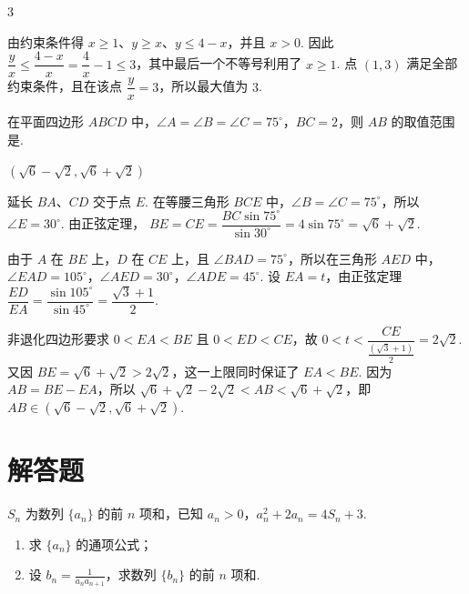\begin{answer}
3
\end{answer}

\begin{solution}
由约束条件得 \(x\geqslant1\)、\(y\geqslant x\)、\(y\leqslant4-x\)，并且 \(x>0\). 因此
\(\dfrac yx\leqslant\dfrac{4-x}{x}=\dfrac4x-1\leqslant3\)，其中最后一个不等号利用了 \(x\geqslant1\). 点 \((1,3)\) 满足全部约束条件，且在该点 \(\dfrac yx=3\)，所以最大值为 \(3\).
\end{solution}

\begin{problem}
在平面四边形 \(ABCD\) 中，\(\angle A = \angle B = \angle C = 75^{\circ}\)，\(BC = 2\)，则 \(AB\) 的取值范围是\fillinblank{}.
\end{problem}

\begin{answer}
\(\left(\sqrt{6}-\sqrt{2},\sqrt{6}+\sqrt{2}\right)\)
\end{answer}

\begin{solution}
延长 \(BA\)、\(CD\) 交于点 \(E\). 在等腰三角形 \(BCE\) 中，\(\angle B=\angle C=75^{\circ}\)，所以 \(\angle E=30^{\circ}\). 由正弦定理，
\(BE=CE=\dfrac{BC\sin75^{\circ}}{\sin30^{\circ}}=4\sin75^{\circ}=\sqrt6+\sqrt2\).

由于 \(A\) 在 \(BE\) 上，\(D\) 在 \(CE\) 上，且 \(\angle BAD=75^{\circ}\)，所以在三角形 \(AED\) 中，\(\angle EAD=105^{\circ}\)，\(\angle AED=30^{\circ}\)，\(\angle ADE=45^{\circ}\). 设 \(EA=t\)，由正弦定理
\(\dfrac{ED}{EA}=\dfrac{\sin105^{\circ}}{\sin45^{\circ}}=\dfrac{\sqrt3+1}{2}\).

非退化四边形要求 \(0<EA<BE\) 且 \(0<ED<CE\)，故
\(0<t<\dfrac{CE}{\frac{(\sqrt3+1)}{2}}=2\sqrt2\). 又因 \(BE=\sqrt6+\sqrt2>2\sqrt2\)，这一上限同时保证了 \(EA<BE\). 因为 \(AB=BE-EA\)，所以
\(\sqrt6+\sqrt2-2\sqrt2<AB<\sqrt6+\sqrt2\)，即 \(AB\in\left(\sqrt6-\sqrt2,\sqrt6+\sqrt2\right)\).
\end{solution}

\section{解答题}

\begin{problem}
\(S_{n}\) 为数列 \(\{a_{n}\}\) 的前 \(n\) 项和，已知 \(a_{n} > 0\)，\(a_{n}^{2} + 2a_{n} = 4S_{n} + 3\).

\begin{enumerate}
\item 求 \(\{a_{n}\}\) 的通项公式；
\item 设 \(b_{n} = \frac{1}{a_{n}a_{n + 1}}\)，求数列 \(\{b_n\}\) 的前 \(n\) 项和.
\end{enumerate}
\end{problem}

